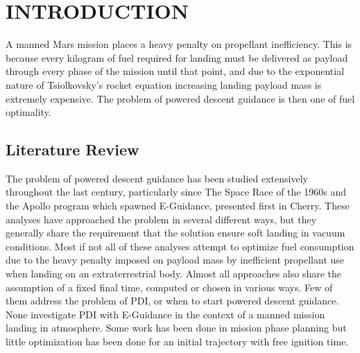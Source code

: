 %

\chapter{INTRODUCTION}
\label{chap:intro}
A manned Mars mission places a heavy penalty on propellant inefficiency. This is because every kilogram of fuel required for landing must be delivered as payload through every phase of the mission until that point, and due to the exponential nature of Tsiolkovsky's rocket equation increasing landing payload mass is extremely expensive. The problem of powered descent guidance is then one of fuel optimality.

\section{Literature Review}
The problem of powered descent guidance has been studied extensively throughout the last century, particularly since The Space Race of the 1960s and the Apollo program which spawned E-Guidance, presented first in Cherry\:\cite{CHERRY}. These analyses have approached the problem in several different ways, but they generally share the requirement that the solution ensure soft landing in vacuum conditions. Most if not all of these analyses attempt to optimize fuel consumption due to the heavy penalty imposed on payload mass by inefficient propellant use when landing on an extraterrestrial body. Almost all approaches also share the assumption of a fixed final time, computed or chosen in various ways. Few of them address the problem of PDI, or when to start powered descent guidance. None investigate PDI with E-Guidance in the context of a manned mission landing in atmosphere. Some work has been done in mission phase planning but little optimization has been done for an  initial trajectory with free ignition time.

